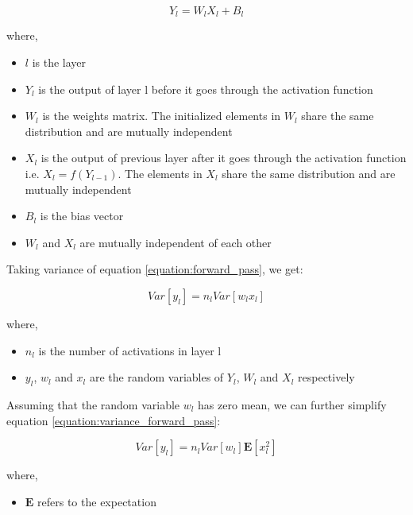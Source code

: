 \begin{equation}
    \label{equation:forward_pass}
    Y_l = W_lX_l + B_l
\end{equation}

where,
\begin{itemize}[label={}]
  \setlength\itemsep{0em}
  \item $l$ is the layer
  \item $Y_l$ is the output of layer l before it goes through the activation function
  \item $W_l$ is the weights matrix. The initialized elements in $W_l$ share the same distribution and are mutually independent
  \item $X_l$ is the output of previous layer after it goes through the activation function i.e. $X_l = f(Y_{l-1})$. The elements in $X_l$ share the same distribution and are mutually independent
  \item $B_l$ is the bias vector
  \item $W_l$ and $X_l$ are mutually independent of each other
\end{itemize}

Taking variance of equation \ref{equation:forward_pass}, we get:

\begin{equation}
    \label{equation:variance_forward_pass}
    Var[y_l] = n_l Var[w_lx_l]
\end{equation}

where,
\begin{itemize}[label={}]
  \setlength\itemsep{0em}
  \item $n_l$ is the number of activations in layer l
  \item $y_l$, $w_l$ and $x_l$ are the random variables of $Y_l$, $W_l$ and $X_l$ respectively
\end{itemize}

Assuming that the random variable $w_l$ has zero mean, we can further simplify equation \ref{equation:variance_forward_pass}:

\begin{equation}
    \label{equation:expectation_forward_pass}
    Var[y_l] = n_l Var[w_l]\mathbf{E}[x_l^2]
\end{equation}

where,
\begin{itemize}[label={}]
  \setlength\itemsep{0em}
  \item $\mathbf{E}$ refers to the expectation
\end{itemize}

